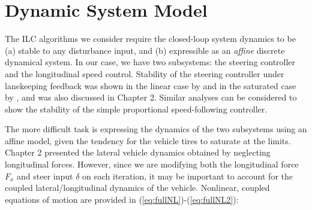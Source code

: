 \section{Dynamic System Model}
\label{sec:ch4dsm}
The ILC algorithms we consider require the closed-loop system dynamics to be (a) stable to any disturbance input, and (b) expressible as an \textit{affine} discrete dynamical system.
In our case, we have two subsystems: the steering controller and the longitudinal speed control. Stability of the steering controller
under lanekeeping feedback was shown in the linear case by \cite{rossetter2002} and in the saturated case by \cite{talvala}, and was also 
discussed in Chapter 2. Similar analyses can be considered to show the stability of the simple proportional speed-following controller.

The more difficult task is expressing the dynamics of the two subsystems using an affine model, given the tendency for the vehicle tires
to saturate at the limits. Chapter 2 presented the  lateral vehicle dynamics obtained by neglecting longitudinal forces. However, since we are 
modifying both the longitudinal force $F_x$ and steer input $\delta$ on each iteration, it may be important to account for the coupled
lateral/longitudinal dynamics of the vehicle. Nonlinear, coupled equations of motion are provided in (\ref{eq:fullNL})-(\ref{eq:fullNL2}):

